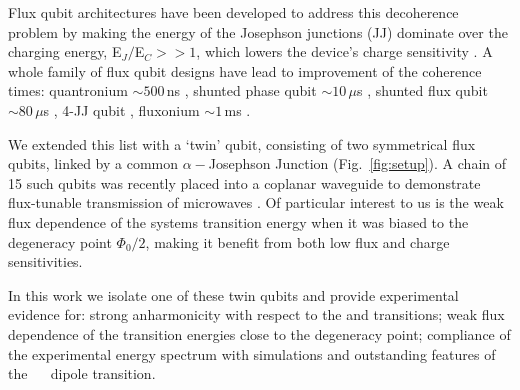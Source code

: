Flux qubit architectures have been developed to address this decoherence problem by making the
energy of the  Josephson junctions (JJ) dominate  over the charging energy,  E$_J/$E$_C >> 1$,
which lowers  the device's  charge sensitivity  \cite{orlando1999,chiorescu2003,mooij1999}.  A
whole  family  of  flux qubit  designs  have  lead  to  improvement of  the  coherence  times:
quantronium   $\sim500\,$ns   \cite{cottet2002,gu2017},   shunted    phase   qubit   $\sim10\,\mu   $s
\cite{stern2014} ,  shunted flux qubit  $\sim80\,\mu$s \cite{yan2016} , 4-JJ  qubit \cite{qui2016},
fluxonium $\sim1\,$ms \cite{pop2014}.

We extended this list  with a `twin' qubit, consisting of two  symmetrical flux qubits, linked
by a  common $ \alpha-$Josephson  Junction (Fig.~\ref{fig:setup}).  A chain  of 15 such  qubits was
recently  placed  into  a  coplanar  waveguide to  demonstrate  flux-tunable  transmission  of
microwaves \cite{shulga2018}.  Of particular interest to us is the weak flux dependence of the
systems transition  energy when  it was  biased to the  degeneracy point  $\Phi_0/2 $,  making it
benefit from both low flux and charge sensitivities.
 
In this work we isolate one of these twin qubits and provide experimental evidence for: strong
anharmonicity with respect to the \ilra{} and \ilra{} transitions;
weak flux dependence of  the transition energies close to the  degeneracy point; compliance of
the  experimental   energy  spectrum  with   simulations  and  outstanding  features   of  the
~\ilra~ dipole transition.

